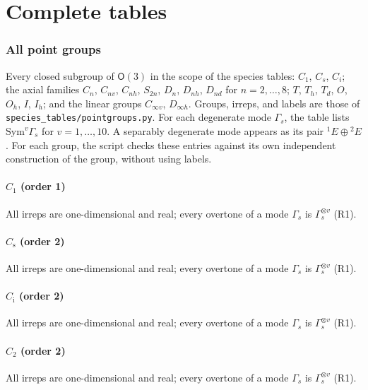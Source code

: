 \documentclass[11pt]{article}
\begin{document}
\clearpage
\part{Complete tables}
\section{All point groups}
\label{sec:complete}

Every closed subgroup of $\mathsf O(3)$ in the scope of the species tables: $C_1$, $C_s$, $C_i$; the axial families $C_n$, $C_{nv}$, $C_{nh}$, $S_{2n}$, $D_n$, $D_{nh}$, $D_{nd}$ for $n=2,\ldots,8$; $T$, $T_h$, $T_d$, $O$, $O_h$, $I$, $I_h$; and the linear groups $C_{\infty v}$, $D_{\infty h}$. Groups, irreps, and labels are those of \texttt{species\_tables/pointgroups.py}. For each degenerate mode $\Gamma_s$, the table lists $\mathrm{Sym}^v\Gamma_s$ for $v=1,\ldots,10$. A separably degenerate mode appears as its pair ${}^1E\oplus{}^2E$. For each group, the script checks these entries against its own independent construction of the group, without using labels.

\subsection*{$C_1$ \quad (order 1)}
All irreps are one-dimensional and real; every overtone of a mode $\Gamma_s$ is $\Gamma_s^{\otimes v}$ (R1).

\subsection*{$C_{\mathrm s}$ \quad (order 2)}
All irreps are one-dimensional and real; every overtone of a mode $\Gamma_s$ is $\Gamma_s^{\otimes v}$ (R1).

\subsection*{$C_{\mathrm i}$ \quad (order 2)}
All irreps are one-dimensional and real; every overtone of a mode $\Gamma_s$ is $\Gamma_s^{\otimes v}$ (R1).

\subsection*{$C_{2}$ \quad (order 2)}
All irreps are one-dimensional and real; every overtone of a mode $\Gamma_s$ is $\Gamma_s^{\otimes v}$ (R1).
\end{document}
